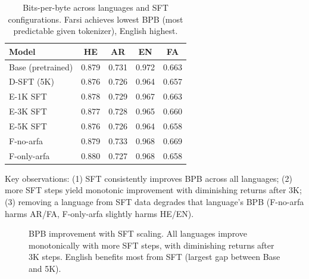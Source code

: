 \documentclass[10pt,twocolumn]{article}
\begin{document}
\begin{table}[H]
\centering\small
\begin{tabular}{lcccc}
\toprule
\textbf{Model} & \textbf{HE} & \textbf{AR} & \textbf{EN} & \textbf{FA} \\
\midrule
Base (pretrained) & 0.879 & 0.731 & 0.972 & 0.663 \\
D-SFT (5K) & 0.876 & 0.726 & 0.964 & 0.657 \\
E-1K SFT & 0.878 & 0.729 & 0.967 & 0.663 \\
E-3K SFT & 0.877 & 0.728 & 0.965 & 0.660 \\
E-5K SFT & 0.876 & 0.726 & 0.964 & 0.658 \\
F-no-arfa & 0.879 & 0.733 & 0.968 & 0.669 \\
F-only-arfa & 0.880 & 0.727 & 0.968 & 0.658 \\
\bottomrule
\end{tabular}
\caption{Bits-per-byte across languages and SFT configurations. Farsi achieves lowest BPB (most predictable given tokenizer), English highest.}
\label{tab:bpb}
\end{table}

Key observations: (1) SFT consistently improves BPB across all languages; (2) more SFT steps yield monotonic improvement with diminishing returns after 3K; (3) removing a language from SFT data degrades that language's BPB (F-no-arfa harms AR/FA, F-only-arfa slightly harms HE/EN).

\begin{figure}[H]
\centering
{}
\caption{BPB improvement with SFT scaling. All languages improve monotonically with more SFT steps, with diminishing returns after 3K steps. English benefits most from SFT (largest gap between Base and 5K).}
\label{fig:bpb_scaling}
\end{figure}
\end{document}
